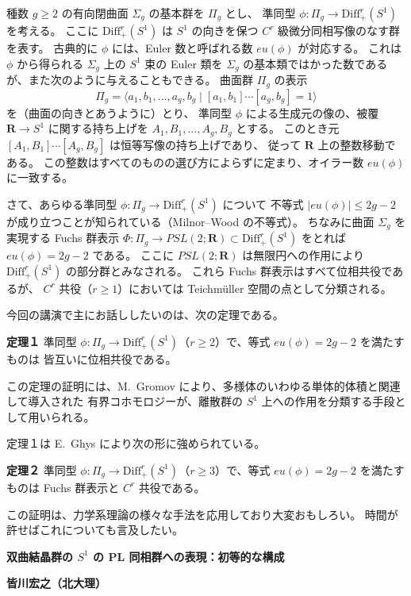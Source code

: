 \documentclass[uplatex,dvipdfmx]{jlreq}
\newcommand{\Diff}{\mathrm{Diff}^r_+(S^1)}
\newcommand{\R}{\mathbf{R}}
\begin{document}
\medskip

種数 $g \geq 2$ の有向閉曲面 $\Sigma_g$ の基本群を $\Pi_g$ とし、
準同型 $\phi : \Pi_g \to \Diff$ を考える。
ここに $\Diff$ は $S^1$ の向きを保つ $C^r$ 級微分同相写像のなす群を表す。
古典的に $\phi$ には、Euler 数と呼ばれる数 $eu(\phi)$ が対応する。
これは $\phi$ から得られる $\Sigma_g$ 上の $S^1$ 束の Euler 類を
$\Sigma_g$ の基本類ではかった数であるが、また次のように与えることもできる。
曲面群 $\Pi_g$ の表示
\[
  \Pi_g = \langle a_1, b_1, \ldots, a_g, b_g \mid [a_1,b_1] \cdots [a_g,b_g] = 1 \rangle
\]
を（曲面の向きとあうように）とり、
準同型 $\phi$ による生成元の像の、被覆 $\R \to S^1$ に関する持ち上げを
$A_1, B_1, \ldots, A_g, B_g$ とする。
このとき元 $[A_1, B_1] \cdots [A_g, B_g]$ は恒等写像の持ち上げであり、
従って $\R$ 上の整数移動である。
この整数はすべてのものの選び方によらずに定まり、オイラー数 $eu(\phi)$ に一致する。

さて、あらゆる準同型 $\phi : \Pi_g \to \Diff$ について
不等式 $|eu(\phi)| \leq 2g - 2$ が成り立つことが知られている（Milnor--Wood の不等式）。
ちなみに曲面 $\Sigma_g$ を実現する Fuchs 群表示
$\Phi : \Pi_g \to PSL(2;\R) \subset \Diff$ をとれば $eu(\phi) = 2g - 2$ である。
ここに $PSL(2;\R)$ は無限円への作用により $\Diff$ の部分群とみなされる。
これら Fuchs 群表示はすべて位相共役であるが、
$C^r$ 共役（$r \geq 1$）においては Teichmüller 空間の点として分類される。

今回の講演で主にお話ししたいのは、次の定理である。

\medskip
\noindent
\textbf{定理１}\quad
準同型 $\phi : \Pi_g \to \Diff$（$r \geq 2$）で、等式 $eu(\phi) = 2g - 2$ を満たすものは
皆互いに位相共役である。

\medskip

この定理の証明には、M.~Gromov により、多様体のいわゆる単体的体積と関連して導入された
有界コホモロジーが、離散群の $S^1$ 上への作用を分類する手段として用いられる。

定理１は E.~Ghys により次の形に強められている。

\medskip
\noindent
\textbf{定理２}\quad
準同型 $\phi : \Pi_g \to \Diff$（$r \geq 3$）で、等式 $eu(\phi) = 2g - 2$ を満たすものは
Fuchs 群表示と $C^r$ 共役である。

\medskip

この証明は、力学系理論の様々な手法を応用しており大変おもしろい。
時間が許せばこれについても言及したい。

\newpage

\begin{center}
  {\large\bfseries 双曲結晶群の $S^1$ の PL 同相群への表現：初等的な構成}
\end{center}
\begin{flushright}
  \textbf{皆川宏之（北大理）}
\end{flushright}
\end{document}
